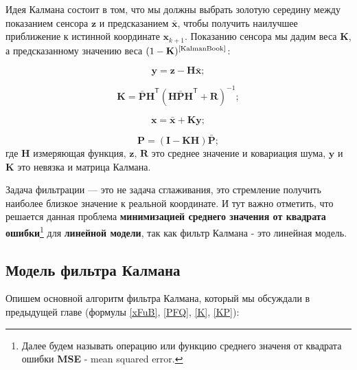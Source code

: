 \documentclass[a4paper,11pt]{article} %
\begin{document}
Идея Калмана состоит в том,  что мы должны выбрать золотую середину между показанием сенсора $\mathbf z$ и предсказанием $\mathbf{\bar x}$, чтобы получить наилучшее приближение к истинной координате $\mathbf x_{k+1}$.  Показанию сенсора мы дадим веса  $\mathbf K$, а предсказанному значению веса  $(1-\mathbf K)^\text{\cite{KalmanBook}}$:

$$\mathbf y = \mathbf z - \mathbf{H\bar x};$$

$$\mathbf K = \mathbf{\bar{P}H}^\mathsf T (\mathbf{H\bar{P}H}^\mathsf T + \mathbf R)^{-1};$$

\begin{equation}\label{K}
\mathbf x = \bar{\mathbf x} + \mathbf{Ky};
\end{equation}

\begin{equation}\label{KP}
\mathbf P = (\mathbf I - \mathbf{KH})\mathbf{\bar{P}};
\end{equation}
 где $\mathbf H$ измеряющая функция,  $\mathbf z,\, \mathbf R$ это среднее значение и ковариация шума,  $\mathbf y$ и $\mathbf K$ это невязка и матрица Калмана.

Задача фильтрации — это не задача сглаживания,  это стремление получить наиболее близкое значение к реальной координате.  И тут важно отметить,  что решается данная проблема \textbf{минимизацией среднего значения от квадрата ошибки}\footnote{Далее будем называть операцию или функцию среднего значеня от квадрата ошибки \textbf{MSE} - mean squared error.}  для \textbf{линейной модели},  так как фильтр  Калмана - это линейная модель.
\subsection{Модель фильтра Калмана}
Опишем основной алгоритм фильтра Калмана,  который мы обсуждали в предыдущей главе (формулы \eqref{xFuB}, \eqref{PFQ}, \eqref{K}, \eqref{KP}):
\end{document}
